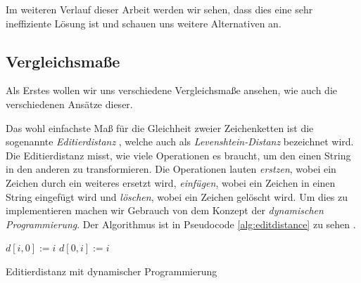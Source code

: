 \documentclass[sigconf]{acmart}
\DeclarePairedDelimiter\abs{\lvert}{\rvert}
\begin{document}
Im weiteren Verlauf dieser Arbeit werden wir sehen, dass dies eine sehr
ineffiziente Lösung ist und schauen uns weitere Alternativen an.


\subsection*{Vergleichsmaße}
Als Erstes wollen wir uns verschiedene Vergleichsmaße ansehen, 
wie auch die verschiedenen Ansätze dieser.

Das wohl einfachste Maß für die Gleichheit zweier Zeichenketten
ist die sogenannte \emph{Editierdistanz} \cite[Vgl. S. 2] {cohen2003comparison}, 
welche auch als \emph{Levenshtein-Distanz} bezeichnet wird.
Die Editierdistanz misst, wie viele Operationen es braucht, 
um den einen String in den anderen zu transformieren. 
Die Operationen lauten \emph{erstzen}, wobei ein Zeichen
durch ein weiteres ersetzt wird, \emph{einfügen}, wobei ein
Zeichen in einen String eingefügt wird und \emph{löschen}, 
wobei ein Zeichen gelöscht wird. Um dies zu implementieren 
machen wir Gebrauch von dem Konzept der 
\emph{dynamischen Programmierung}. Der Algorithmus ist
in Pseudocode \ref{alg:editdistance} zu sehen 
\cite[Vgl. S. 223] {bille2005survey}.

  \begin{algorithm}
    \begin{algorithmic}[1]
      
        \State $d[i,0] := i$
      \EndFor
        \State $d[0,i] := i$
      \EndFor

          \Else
          \EndIf
          \State {}
        \EndFor
      \EndFor
    
      \EndProcedure
      
    \end{algorithmic}
    \caption{Editierdistanz mit dynamischer Programmierung}
    \label{alg:editdistance}
    \end{algorithm}
\end{document}
